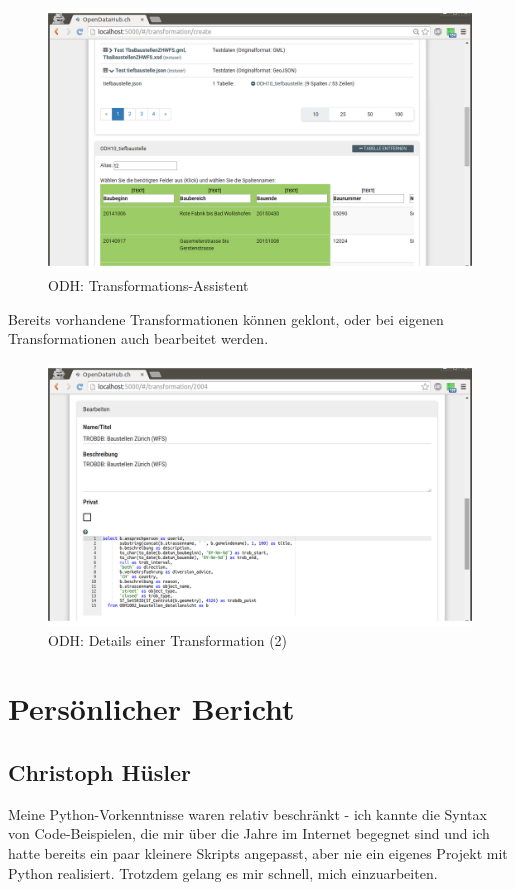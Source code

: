 \begin{figure}[H]
    \centering
    \includegraphics[width=2\linewidth/3]{fig/odh-transformation-assistant}
    \caption{ODH: Transformations-Assistent}
\end{figure}

Bereits vorhandene Transformationen können geklont, oder bei eigenen Transformationen auch bearbeitet werden.

\begin{figure}[H]
    \centering
    \includegraphics[width=2\linewidth/3]{fig/odh-edit-transformation}
    \caption{ODH: Details einer Transformation (2)}
\end{figure}

\section{Persönlicher Bericht}

\subsection{Christoph Hüsler}
Meine Python-Vorkenntnisse waren relativ beschränkt - ich kannte die Syntax von Code-Beispielen, die mir über die Jahre im Internet begegnet sind und ich hatte bereits ein paar kleinere Skripts angepasst, aber nie ein eigenes Projekt mit Python realisiert. Trotzdem gelang es mir schnell, mich einzuarbeiten.

